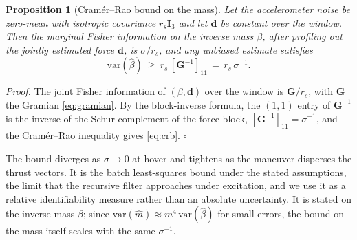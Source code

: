 \documentclass{ieeeaccess}
\newtheorem{proposition}{Proposition}
\renewenvironment{proof}{\noindent\textit{Proof.}}{\hfill$\square$\medskip}
\newcommand{\vect}[1]{\bm{#1}}
\newcommand{\mat}[1]{\mathbf{#1}}
\begin{document}
\begin{proposition}[Cram\'er--Rao bound on the mass]\label{prop:crb}
Let the accelerometer noise be zero-mean with isotropic covariance $r_s\mat{I}_3$
and let $\vect{d}$ be constant over the window. Then the marginal Fisher
information on the inverse mass $\beta$, after profiling out the jointly
estimated force $\vect{d}$, is $\sigma/r_s$, and any unbiased estimate satisfies
\begin{equation}
\mathrm{var}(\hat\beta)\ \geq\ r_s\,[\mat{G}^{-1}]_{11}\,=\,r_s\,\sigma^{-1}.
\label{eq:crb}
\end{equation}
\end{proposition}
\begin{proof}
The joint Fisher information of $(\beta,\vect{d})$ over the window is
$\mat{G}/r_s$, with $\mat{G}$ the Gramian \eqref{eq:gramian}. By the block-inverse
formula, the $(1,1)$ entry of $\mat{G}^{-1}$ is the inverse of the Schur complement
of the force block, $[\mat{G}^{-1}]_{11}=\sigma^{-1}$, and the Cram\'er--Rao
inequality gives \eqref{eq:crb}.
\end{proof}

The bound diverges as $\sigma\to0$ at hover and tightens as the maneuver disperses
the thrust vectors. It is the batch least-squares bound under the stated
assumptions, the limit that the recursive filter approaches under excitation, and
we use it as a relative identifiability measure rather than an absolute
uncertainty. It is stated on the inverse mass $\beta$; since
$\mathrm{var}(\hat m)\approx m^4\,\mathrm{var}(\hat\beta)$ for small errors, the
bound on the mass itself scales with the same $\sigma^{-1}$.
\end{document}
